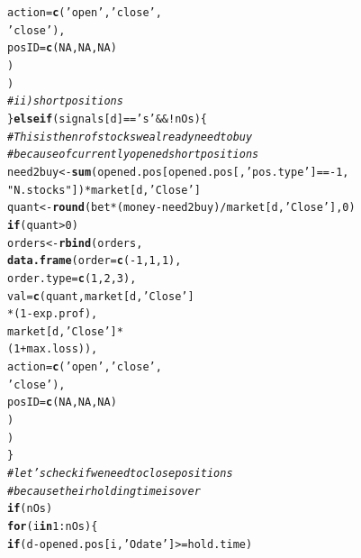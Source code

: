 \documentclass{article}\usepackage[]{graphicx}\usepackage[]{color}
\makeatletter
\newcommand{\hlnum}[1]{\textcolor[rgb]{0.686,0.059,0.569}{#1}}%
\newcommand{\hlstr}[1]{\textcolor[rgb]{0.192,0.494,0.8}{#1}}%
\newcommand{\hlcom}[1]{\textcolor[rgb]{0.678,0.584,0.686}{\textit{#1}}}%
\newcommand{\hlopt}[1]{\textcolor[rgb]{0,0,0}{#1}}%
\newcommand{\hlstd}[1]{\textcolor[rgb]{0.345,0.345,0.345}{#1}}%
\newcommand{\hlkwa}[1]{\textcolor[rgb]{0.161,0.373,0.58}{\textbf{#1}}}%
\newcommand{\hlkwb}[1]{\textcolor[rgb]{0.69,0.353,0.396}{#1}}%
\newcommand{\hlkwc}[1]{\textcolor[rgb]{0.333,0.667,0.333}{#1}}%
\newcommand{\hlkwd}[1]{\textcolor[rgb]{0.737,0.353,0.396}{\textbf{#1}}}%
\newenvironment{kframe}{%
 \def\at@end@of@kframe{}%
 \ifinner\ifhmode%
  \def\at@end@of@kframe{\end{minipage}}%
  \begin{minipage}{\columnwidth}%
 \fi\fi%
 \def\FrameCommand##1{\hskip\@totalleftmargin \hskip-\fboxsep
 \colorbox{shadecolor}{##1}\hskip-\fboxsep
     \hskip-\linewidth \hskip-\@totalleftmargin \hskip\columnwidth}%
 \MakeFramed {\advance\hsize-\width
   \@totalleftmargin\z@ \linewidth\hsize
   \@setminipage}}%
 {\par\unskip\endMakeFramed%
 \at@end@of@kframe}
\newenvironment{knitrout}{}{} %
\makeatother
\begin{document}
\begin{CJK*}{UTF8}{gkai}
\begin{knitrout}
\begin{kframe}
\begin{alltt}
                                         \hlkwc{action} \hlstd{=} \hlkwd{c}\hlstd{(}\hlstr{'open'}\hlstd{,} \hlstr{'close'}\hlstd{,}
                                                    \hlstr{'close'}\hlstd{),}
                                         \hlkwc{posID} \hlstd{=} \hlkwd{c}\hlstd{(}\hlnum{NA}\hlstd{,} \hlnum{NA}\hlstd{,} \hlnum{NA}\hlstd{)}
                                         \hlstd{)}
                      \hlstd{)}
    \hlcom{#ii) short positions}
  \hlstd{\}} \hlkwa{else if} \hlstd{(signals[d]} \hlopt{==} \hlstr{'s'} \hlopt{&& !}\hlstd{nOs) \{}
    \hlcom{#This is the nr of stocks we already need to buy}
    \hlcom{#because of currently opened short positions}
    \hlstd{need2buy} \hlkwb{<-} \hlkwd{sum}\hlstd{(opened.pos[opened.pos[,} \hlstr{'pos.type'}\hlstd{]} \hlopt{== -}\hlnum{1}\hlstd{,}
                               \hlstr{"N.stocks"}\hlstd{])}\hlopt{*}\hlstd{market[d,} \hlstr{'Close'}\hlstd{]}
    \hlstd{quant} \hlkwb{<-} \hlkwd{round}\hlstd{(bet}\hlopt{*}\hlstd{(money}\hlopt{-}\hlstd{need2buy)}\hlopt{/}\hlstd{market[d,} \hlstr{'Close'}\hlstd{],} \hlnum{0}\hlstd{)}
    \hlkwa{if}\hlstd{(quant} \hlopt{>} \hlnum{0}\hlstd{)}
      \hlstd{orders} \hlkwb{<-} \hlkwd{rbind}\hlstd{(orders,}
                      \hlkwd{data.frame}\hlstd{(}\hlkwc{order} \hlstd{=} \hlkwd{c}\hlstd{(}\hlopt{-}\hlnum{1}\hlstd{,} \hlnum{1}\hlstd{,} \hlnum{1}\hlstd{),}
                                 \hlkwc{order.type} \hlstd{=} \hlkwd{c}\hlstd{(}\hlnum{1}\hlstd{,} \hlnum{2}\hlstd{,} \hlnum{3}\hlstd{),}
                                 \hlkwc{val} \hlstd{=} \hlkwd{c}\hlstd{(quant, market[d,} \hlstr{'Close'}\hlstd{]}
                                         \hlopt{*}\hlstd{(}\hlnum{1}\hlopt{-}\hlstd{exp.prof),}
                                         \hlstd{market[d,} \hlstr{'Close'}\hlstd{]}\hlopt{*}
                                           \hlstd{(}\hlnum{1} \hlopt{+} \hlstd{max.loss)),}
                                 \hlkwc{action} \hlstd{=} \hlkwd{c}\hlstd{(}\hlstr{'open'}\hlstd{,} \hlstr{'close'}\hlstd{,}
                                            \hlstr{'close'}\hlstd{),}
                                 \hlkwc{posID} \hlstd{=} \hlkwd{c}\hlstd{(}\hlnum{NA}\hlstd{,} \hlnum{NA}\hlstd{,} \hlnum{NA}\hlstd{)}
                                 \hlstd{)}
                      \hlstd{)}
  \hlstd{\}}
  \hlcom{#let's check if we need to close positions}
  \hlcom{#because their holding time is over }
  \hlkwa{if}\hlstd{(nOs)}
    \hlkwa{for}\hlstd{(i} \hlkwa{in} \hlnum{1}\hlopt{:}\hlstd{nOs) \{}
      \hlkwa{if}\hlstd{(d} \hlopt{-} \hlstd{opened.pos[i,} \hlstr{'Odate'}\hlstd{]} \hlopt{>=} \hlstd{hold.time)}

\end{alltt}
\end{kframe}
\end{knitrout}
\end{CJK*}
\end{document}
